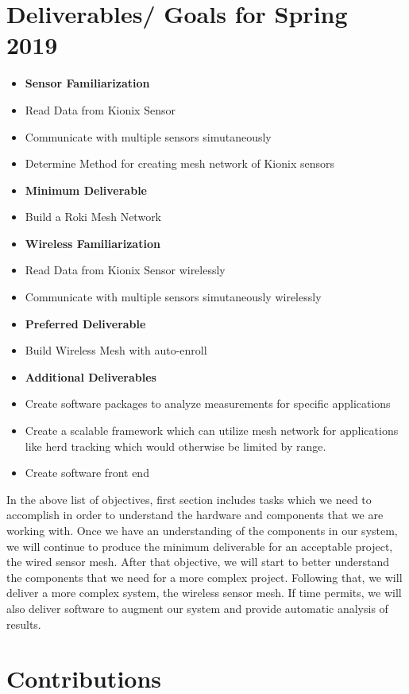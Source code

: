 \documentclass[11pt, a4paper]{article}
\begin{document}
\section{Deliverables/ Goals for Spring 2019}
\begin{itemize}
	\item[] \textbf{Sensor Familiarization}
	\item Read Data from Kionix Sensor \cite{kionix}
	\item Communicate with multiple sensors simutaneously
	\item Determine Method for creating mesh network of Kionix sensors
	\item[] \textbf{Minimum Deliverable}
	\item Build a Roki Mesh Network
	\item[] \textbf{Wireless Familiarization}
	\item Read Data from Kionix Sensor wirelessly
	\item Communicate with multiple sensors simutaneously wirelessly
	\item[] \textbf{Preferred Deliverable}
	\item Build Wireless Mesh with auto-enroll
	\item[] \textbf{Additional Deliverables}
	\item Create software packages to analyze measurements for specific applications
	\item Create a scalable framework which can utilize mesh network for applications like herd tracking which would otherwise be limited by range.
	\item Create software front end
\end{itemize}

In the above list of objectives, first section includes tasks which we need to accomplish in order to understand the hardware and components that we are working with. Once we have an understanding of the components in our system, we will continue to produce the minimum deliverable for an acceptable project, the wired sensor mesh. After that objective, we will start to better understand the components that we need for a more complex project. Following that, we will deliver a more complex system, the wireless sensor mesh. If time permits, we will also deliver software to augment our system and provide automatic analysis of results. 



\section{Contributions}
\end{document}
